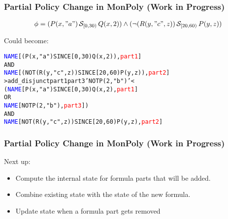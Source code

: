 \begin{frame}
    \frametitle{Partial Policy Change in MonPoly (Work in Progress)}
    \begin{align*}
        \phi = 
        (P(x, "a") \,\mathcal{S}_{[0,30)}\, Q(x, 2))
        \land 
        (\neg (R(y, "c", z)) \,\mathcal{S}_{[20,60)}\, P(y, z))
    \end{align*}

Could become:
\begin{alltt}
\textcolor{blue}{NAME}[(P(x,"a") SINCE[0,30) Q(x,2)), \textcolor{red}{part1}] \\
AND \\
\textcolor{blue}{NAME}[(NOT (R(y,"c",z)) SINCE[20,60) P(y,z)), \textcolor{red}{part2}] \\

>add\_disjunct part1 part3 'NOT P(2,"b")'<\\

(\textcolor{blue}{NAME}[P(x,"a") SINCE[0,30) Q(x,2), \textcolor{red}{part1}] \\
OR \\
\textcolor{blue}{NAME}[NOT P(2,"b"), \textcolor{red}{part3}]) \\
AND \\
\textcolor{blue}{NAME}[NOT (R(y,"c",z)) SINCE[20,60) P(y,z), \textcolor{red}{part2}]
\end{alltt}




\end{frame}


\begin{frame}
    \frametitle{Partial Policy Change in MonPoly (Work in Progress)}

    Next up:

    \begin{itemize}
        \item Compute the internal state for formula parts that will be added.
        \item Combine existing state with the state of the new formula.
        \item Update state when a formula part gets removed
    \end{itemize}

    
\end{frame}